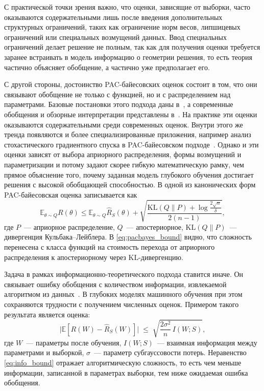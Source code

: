 \documentclass[russian]{intsys}
\begin{document}
С практической точки зрения важно, что оценки, зависящие от выборки, часто оказываются содержательными лишь после введения дополнительных структурных ограничений, таких как ограничение норм весов, липшицевых ограничений или специальных возмущений данных.
Ввод специальных ограничений делает решение не полным, так как для получения оценки требуется заранее встраивать в модель информацию о геометрии решения, то есть теория частично объясняет обобщение, а частично уже предполагает его.

С другой стороны, достоинство PAC-байесовских оценок состоит в том, что они связывают обобщение не только с функцией, но и с распределением над параметрами. Базовые постановки этого подхода даны в~\cite{mcallester1999pac,dziugaite2017computing}, а современные обобщения и обзорные интерпретации представлены в~\cite{zhou2018pacbayescompression,pacbayesinterpolating2023,pacbayes2025survey,hellstrom2025perspectives}.
На практике эти оценки оказываются содержательными среди современных оценок.
Внутри этого же тренда появляются и более специализированные приложения, например анализ стохастического градиентного спуска в PAC-байесовском подходе~\cite{pacbayes2019sgd,lottery2022pacbayes}.
Однако и эти оценки зависят от выбора априорного распределения, формы возмущений и параметризации и потому задают скорее гибкую математическую рамку, чем прямое объяснение того, почему заданная модель глубокого обучения достигает решения с высокой обобщающей способностью.
В одной из канонических форм PAC-байесовская оценка записывается как
\begin{equation}
\mathbb E_{\theta\sim Q}R(\theta)\le
\mathbb E_{\theta\sim Q}\hat R_S(\theta)+
\sqrt{\frac{\mathrm{KL}(Q\|P)+\log\frac{2\sqrt n}{\delta}}{2(n-1)}},
\label{eq:pacbayes_bound}
\end{equation}
где $P$~--- априорное распределение, $Q$~--- апостериорное, $\mathrm{KL}(Q\|P)$~--- дивергенция Кульбака--Лейблера. В \eqref{eq:pacbayes_bound} видно, что сложность перенесена с класса функций на стоимость перехода от априорного распределения к апостериорному через $\mathrm{KL}$-дивергенцию.

Задача в рамках информационно-теоретического подхода ставится иначе. Он связывает ошибку обобщения с количеством информации, извлекаемой алгоритмом из данных~\cite{xu2017information}.
В глубоких моделях машинного обучения при этом сохраняются трудности с получением численных оценок.
Примером такого результата является оценка:
\begin{equation}
\bigl|\mathbb E[R(W)-\hat R_S(W)]\bigr|
\;\le\;
\sqrt{\frac{2\sigma^2}{n}\,I(W;S)},
\label{eq:info_bound}
\end{equation}
где $W$~--- параметры после обучения, $I(W;S)$~--- взаимная информация между параметрами и выборкой, $\sigma$~--- параметр субгауссовости потерь.
Неравенство \eqref{eq:info_bound} отражает алгоритмическую сложность, то есть чем меньше информации, записанной в параметрах выборки, тем ниже ожидаемая ошибка обобщения.
\end{document}
